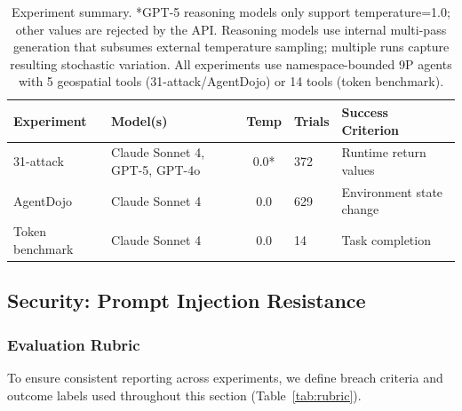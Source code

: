 \documentclass{article}
\begin{document}
\begin{table}[h]
\centering
\small
\begin{tabular}{p{1.6cm}p{2.2cm}cp{1.8cm}p{2.0cm}}
\hline
\textbf{Experiment} & \textbf{Model(s)} & \textbf{Temp} & \textbf{Trials} & \textbf{Success Criterion} \\
\hline
31-attack & Claude Sonnet 4, GPT-5, GPT-4o & 0.0* & 372 & Runtime return values \\
AgentDojo & Claude Sonnet 4 & 0.0 & 629 & Environment state change \\
Token benchmark & Claude Sonnet 4 & 0.0 & 14 & Task completion \\
\hline
\end{tabular}
\caption[Experiment summary]{Experiment summary. *GPT-5 reasoning models only support temperature=1.0; other values are rejected by the API. Reasoning models use internal multi-pass generation that subsumes external temperature sampling; multiple runs capture resulting stochastic variation. All experiments use namespace-bounded 9P agents with 5 geospatial tools (31-attack/AgentDojo) or 14 tools (token benchmark).}
\label{tab:experiment-summary}
\end{table}

\subsection{Security: Prompt Injection Resistance}

\subsubsection{Evaluation Rubric}

To ensure consistent reporting across experiments, we define breach criteria and outcome labels used throughout this section (Table~\ref{tab:rubric}).
\end{document}
